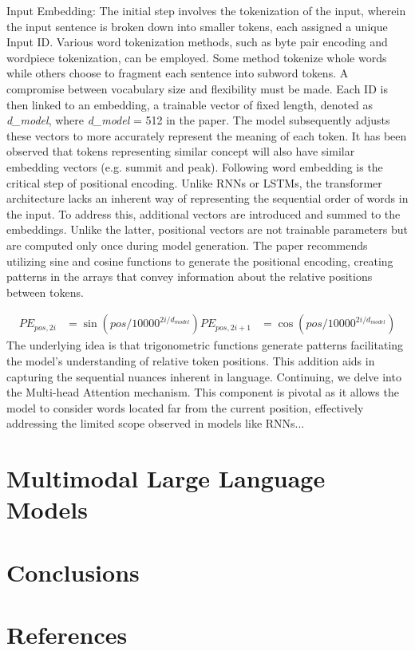 \documentclass[a4paper,12pt]{article}
\begin{document}
Input Embedding: The initial step involves the tokenization of the input, wherein the input sentence is broken down into smaller tokens,
each assigned a unique Input ID. Various word tokenization methods, such as byte pair encoding and wordpiece tokenization, can be employed.
Some method tokenize whole words while others choose to fragment each sentence into subword tokens. 
A compromise between vocabulary size and flexibility must be made. Each ID is then linked to an embedding, a trainable vector of fixed 
length, denoted as \emph{d\_model}, where \emph{d\_model} = 512 in the paper. The model subsequently adjusts these vectors to more 
accurately represent the meaning of each token. It has been observed that tokens representing similar concept will also have similar 
embedding vectors (e.g. summit and peak). Following word embedding is the critical step of positional encoding. Unlike RNNs or LSTMs, 
the transformer architecture lacks an inherent way of representing the sequential order of words in the input. 
To address this, additional vectors are introduced and summed to the embeddings. Unlike the latter, positional vectors are not 
trainable parameters but are computed only once during model generation. The paper recommends utilizing sine and cosine functions 
to generate the positional encoding, creating patterns in the arrays that convey information about the relative positions between tokens.

\begin{displaymath}
  \begin{align}
    PE_{pos,2i} &= \sin(pos/10000^{2i/d_{model}})
  PE_{pos,2i+1} &= \cos(pos/10000^{2i/d_{model}})
  \end{align} 
\end{displaymath}
The underlying idea is that trigonometric functions generate patterns facilitating the model's understanding of relative token positions. 
This addition aids in capturing the sequential nuances inherent in language. Continuing, we delve into the Multi-head Attention mechanism.
This component is pivotal as it allows the model to consider words located far from the current position, effectively addressing the 
limited scope observed in models like RNNs...

\section{Multimodal Large Language Models}
\section{Conclusions}
\section{References}
\end{document}
